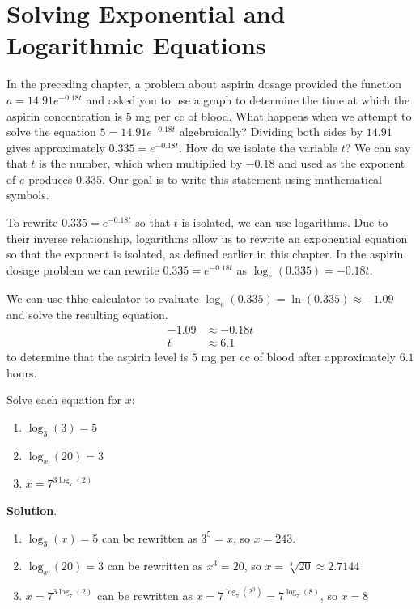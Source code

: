 \documentclass[10pt,]{book}
\theoremstyle{ptxdefinitionnotitle}
\theoremstyle{ptxdefinitiontitle}
\theoremstyle{ptxdefinitionnotitle}
\theoremstyle{ptxdefinitiontitle}
\theoremstyle{ptxdefinitionnotitle}
\theoremstyle{ptxdefinitiontitle}
\numberwithin{equation}{section}
\newcommand{\amp}{&}
\begin{document}
\section[{Solving Exponential and Logarithmic Equations}]{Solving Exponential and Logarithmic Equations}\label{chapter05-section04}
\hypertarget{p-367}{}%
In the preceding chapter, a problem about aspirin dosage provided the function \(a = 14.91e^{-0.18t}\) and asked you to use a graph to determine the time at which the aspirin concentration is \(5\) mg per cc of blood. What happens when we attempt to solve the equation \(5 = 14.91e^{-0.18t}\) algebraically? Dividing both sides by \(14.91\) gives approximately \(0.335 = e^{-0.18t}\). How do we isolate the variable \(t\)?  We can say that \(t\) is the number, which when multiplied by \(-0.18\) and used as the exponent of \(e\) produces \(0.335\).  Our goal is to write this statement using mathematical symbols.%
\par
\hypertarget{p-368}{}%
To rewrite \(0.335 = e^{-0.18t}\) so that \(t\) is isolated, we can use logarithms. Due to their inverse relationship, logarithms allow us to rewrite an exponential equation so that the exponent is isolated, as defined earlier in this chapter. In the aspirin dosage problem we can rewrite \(0.335 = e^{-0.18t}\) as \(\log_e \left( 0.335 \right) = -0.18t\).%
\par
\hypertarget{p-369}{}%
We can use thhe calculator to evaluate \(\log_e \left( 0.335 \right) = \ln \left( 0.335 \right) \approx -1.09\) and solve the resulting equation.%
\begin{align*}
-1.09 \amp \approx -0.18t\\
t \amp \approx 6.1
\end{align*}
to determine that the aspirin level is \(5\) mg per cc of blood after approximately \(6.1\) hours.%
\begin{example}\label{example-29}
\hypertarget{p-370}{}%
Solve each equation for \(x\): \leavevmode%
\begin{enumerate}
\item\hypertarget{li-280}{}\(\log_3 \left( 3 \right) = 5\)%
\item\hypertarget{li-281}{}\(\log_x \left( 20 \right) = 3\)%
\item\hypertarget{li-282}{}\(x = 7^{3\log_7 \left( 2 \right)}\)%
\end{enumerate}
%
\par\smallskip%
\noindent\textbf{Solution}.\hypertarget{solution-29}{}\quad%
\hypertarget{p-371}{}%
\leavevmode%
\begin{enumerate}
\item\hypertarget{li-283}{}\(\log_3 \left( x \right) = 5\) can be rewritten as \(3^5 = x\), so \(x = 243\).%
\item\hypertarget{li-284}{}\(\log_x \left( 20 \right) = 3\) can be rewritten as \(x^3 = 20\), so \(x = \sqrt[3]{20} \approx 2.7144\)%
\item\hypertarget{li-285}{}\(x = 7^{3\log_7 \left( 2 \right)}\) can be rewritten as \(x = 7 ^{\log_7 \left( 2^3 \right)} = 7 ^ {\log_7 \left( 8 \right)}\), so \(x = 8\)%
\end{enumerate}
%
\end{example}
\end{document}
